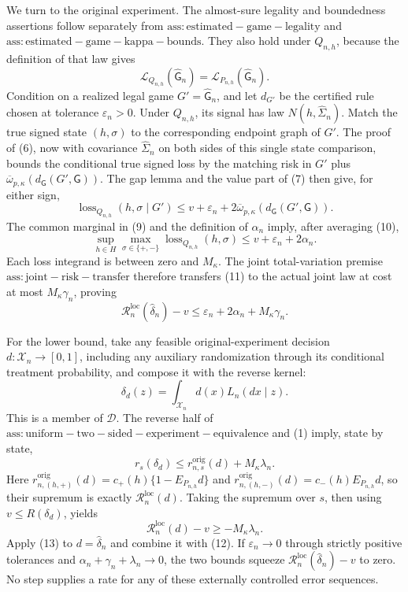 We turn to the original experiment. The almost-sure legality and boundedness assertions follow separately from \(\mathrm{ass:estimated-game-legality}\) and \(\mathrm{ass:estimated-game-kappa-bounds}\). They also hold under \(Q_{n,h}\), because the definition of that law gives
\[
 \mathcal L_{Q_{n,h}}(\widehat{\mathsf G}_n)
 =\mathcal L_{P_{n,h}}(\widehat{\mathsf G}_n). \tag{9}
\]
Condition on a realized legal game \(G'=\widehat{\mathsf G}_n\), and let \(d_{G'}\) be the certified rule chosen at tolerance \(\varepsilon_n>0\). Under \(Q_{n,h}\), its signal has law \(N(h,\widehat\Sigma_n)\). Match the true signed state \((h,\sigma)\) to the corresponding endpoint graph of \(G'\). The proof of (6), now with covariance \(\widehat\Sigma_n\) on both sides of this single state comparison, bounds the conditional true signed loss by the matching risk in \(G'\) plus \(\overline\omega_{p,\kappa}(d_{\mathsf G}(G',\mathsf G))\). The gap lemma and the value part of (7) then give, for either sign,
\[
 \operatorname{loss}_{Q_{n,h}}(h,\sigma\mid G')
 \leq v+\varepsilon_n
 +2\overline\omega_{p,\kappa}(d_{\mathsf G}(G',\mathsf G)). \tag{10}
\]
The common marginal in (9) and the definition of \(\alpha_n\) imply, after averaging (10),
\[
 \sup_{h\in H}\max_{\sigma\in\{+,-\}}
 \operatorname{loss}_{Q_{n,h}}(h,\sigma)
 \leq v+\varepsilon_n+2\alpha_n. \tag{11}
\]
Each loss integrand is between zero and \(M_{\kappa}\). The joint total-variation premise \(\mathrm{ass:joint-risk-transfer}\) therefore transfers (11) to the actual joint law at cost at most \(M_{\kappa}\gamma_n\), proving
\[
 \mathcal R_n^{\mathrm{loc}}(\widehat\delta_n)-v
 \leq\varepsilon_n+2\alpha_n+M_{\kappa}\gamma_n. \tag{12}
\]

For the lower bound, take any feasible original-experiment decision \(d:\mathcal X_n\to[0,1]\), including any auxiliary randomization through its conditional treatment probability, and compose it with the reverse kernel:
\[
 \delta_d(z)=\int_{\mathcal X_n}d(x)L_n(dx\mid z).
\]
This is a member of \(\mathcal D\). The reverse half of \(\mathrm{ass:uniform-two-sided-experiment-equivalence}\) and (1) imply, state by state,
\[
 r_s(\delta_d)\leq r^{\mathrm{orig}}_{n,s}(d)+M_{\kappa}\lambda_n.
\]
Here \(r^{\mathrm{orig}}_{n,(h,+)}(d)=c_{+}(h)\{1-E_{P_{n,h}}d\}\) and \(r^{\mathrm{orig}}_{n,(h,-)}(d)=c_{-}(h)E_{P_{n,h}}d\), so their supremum is exactly \(\mathcal R_n^{\mathrm{loc}}(d)\).
Taking the supremum over \(s\), then using \(v\leq R(\delta_d)\), yields
\[
 \mathcal R_n^{\mathrm{loc}}(d)-v\geq-M_{\kappa}\lambda_n. \tag{13}
\]
Apply (13) to \(d=\widehat\delta_n\) and combine it with (12). If \(\varepsilon_n\to0\) through strictly positive tolerances and \(\alpha_n+\gamma_n+\lambda_n\to0\), the two bounds squeeze \(\mathcal R_n^{\mathrm{loc}}(\widehat\delta_n)-v\) to zero. No step supplies a rate for any of these externally controlled error sequences.
